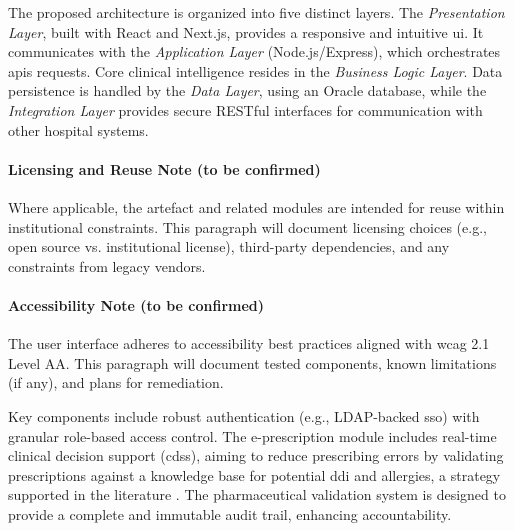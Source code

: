 The proposed architecture is organized into five distinct layers. The \textit{Presentation Layer}, built with React and Next.js, provides a responsive and intuitive \gls{ui}. It communicates with the \textit{Application Layer} (Node.js/Express), which orchestrates \glspl{api} requests. Core clinical intelligence resides in the \textit{Business Logic Layer}. Data persistence is handled by the \textit{Data Layer}, using an Oracle database, while the \textit{Integration Layer} provides secure RESTful interfaces for communication with other hospital systems.

\paragraph{Licensing and Reuse Note (to be confirmed)}
Where applicable, the artefact and related modules are intended for reuse within institutional constraints. This paragraph will document licensing choices (e.g., open source vs. institutional license), third-party dependencies, and any constraints from legacy vendors.

\paragraph{Accessibility Note (to be confirmed)}
The user interface adheres to accessibility best practices aligned with \gls{wcag} 2.1 Level AA. This paragraph will document tested components, known limitations (if any), and plans for remediation.

Key components include robust authentication (e.g., LDAP-backed \gls{sso}) with granular role-based access control. The e-prescription module includes real-time clinical decision support (\gls{cdss}), aiming to reduce prescribing errors by validating prescriptions against a knowledge base for potential \gls{ddi} and allergies, a strategy supported in the literature \cite{bates2014}. The pharmaceutical validation system is designed to provide a complete and immutable audit trail, enhancing accountability.

